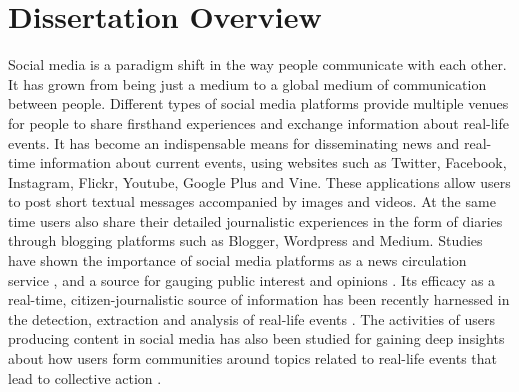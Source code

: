 
\chapter{Dissertation Overview} %

\label{overview} %



Social media is a paradigm shift in the way people communicate with each other. It has grown from being just a medium to a global medium of communication between people. Different types of social media platforms provide multiple venues for people to share firsthand experiences and exchange information about real-life events. It has become an indispensable means for disseminating news and real-time information about current events, using websites such as Twitter, Facebook, Instagram, Flickr, Youtube, Google Plus and Vine. These applications allow users to post short textual messages accompanied by images and videos. At the same time users also share their detailed journalistic experiences in the form of diaries through blogging platforms such as Blogger, Wordpress and Medium. Studies have shown the importance of social media platforms as a news circulation service \cite{phelan2009using}, and a source for gauging public interest and opinions \cite{o2010tweets,singh2010clustering,singh2010mining,agarwal2012online}. Its efficacy as a real-time, citizen-journalistic source of information has been recently harnessed in the detection, extraction and analysis of real-life events \cite{sakaki2013tweet,popescu2011extracting,purohit2013twitris}. The activities of users producing content in social media has also been studied for gaining deep insights about how users form communities around topics related to real-life events \cite{agarwal2013grouping,agarwal2014time,sen2012identifying} that lead to collective action \cite{agarwal2014online,agarwal2012raising}.

